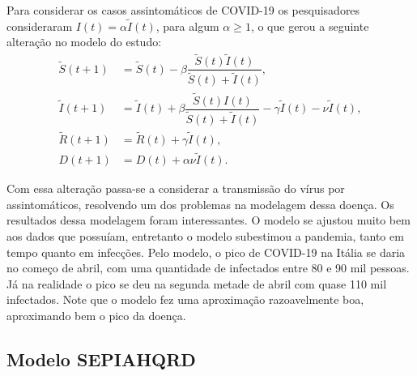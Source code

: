 \documentclass{article}
\begin{document}
Para considerar os casos assintomáticos de COVID-19 os pesquisadores consideraram $I(t) = \alpha\tilde{I}(t)$, para algum $\alpha \geq 1$, o que gerou a seguinte alteração no modelo do estudo:
\begin{equation*}
    \begin{split}
        \tilde{S}(t + 1) & = \tilde{S}(t) - \beta \dfrac{\tilde{S}(t) \tilde{I}(t)}{\tilde{S}(t) + \tilde{I}(t)}, \\
        \tilde{I}(t + 1) & = \tilde{I}(t) + \beta \dfrac{\tilde{S}(t) I(t)}{\tilde{S}(t) + \tilde{I}(t)} - \gamma \tilde{I}(t) - \nu \tilde{I}(t), \\
        \tilde{R}(t + 1) & = \tilde{R}(t) + \gamma \tilde{I}(t), \\
        D(t + 1) & = D(t) + \alpha \nu \tilde{I}(t).
    \end{split}
\end{equation*}

Com essa alteração passa-se a considerar a transmissão do vírus por assintomáticos, resolvendo um dos problemas na modelagem dessa doença. Os resultados dessa modelagem foram interessantes. O modelo se ajustou muito bem aos dados que possuíam, entretanto o modelo subestimou a pandemia, tanto em tempo quanto em infecções. Pelo modelo, o pico de COVID-19 na Itália se daria no começo de abril, com uma quantidade de infectados entre 80 e 90 mil pessoas. Já na realidade o pico se deu na segunda metade de abril com quase 110 mil infectados. Note que o modelo fez uma aproximação razoavelmente boa, aproximando bem o pico da doença.

\subsection{Modelo SEPIAHQRD}
\end{document}
